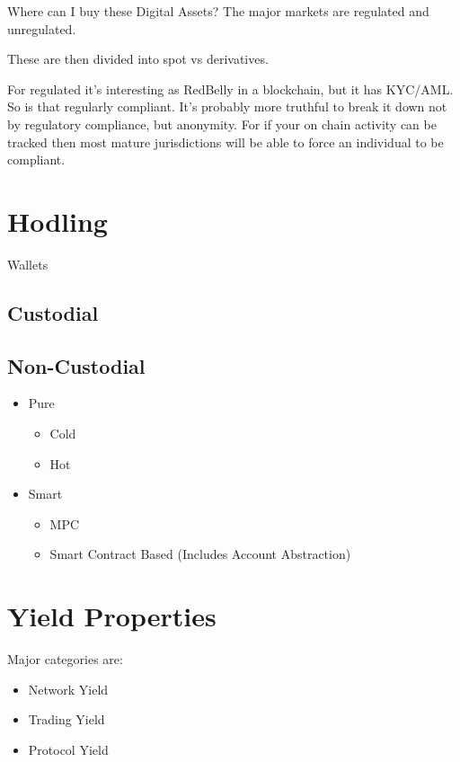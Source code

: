 \documentclass[
  letterpaper,
  DIV=11,
  numbers=noendperiod]{scrreprt}
\providecommand{\tightlist}{%
  \setlength{\itemsep}{0pt}\setlength{\parskip}{0pt}}\usepackage{longtable,booktabs,array}
\begin{document}
Where can I buy these Digital Assets? The major markets are regulated
and unregulated.

These are then divided into spot vs derivatives.

For regulated it's interesting as RedBelly in a blockchain, but it has
KYC/AML. So is that regularly compliant. It's probably more truthful to
break it down not by regulatory compliance, but anonymity. For if your
on chain activity can be tracked then most mature jurisdictions will be
able to force an individual to be compliant.

\section{Hodling}\label{hodling}

Wallets

\subsection{Custodial}\label{custodial}

\subsection{Non-Custodial}\label{non-custodial}

\begin{itemize}
\tightlist
\item
  Pure

  \begin{itemize}
  \tightlist
  \item
    Cold
  \item
    Hot
  \end{itemize}
\item
  Smart

  \begin{itemize}
  \tightlist
  \item
    MPC
  \item
    Smart Contract Based (Includes Account Abstraction)
  \end{itemize}
\end{itemize}

\section{Yield Properties}\label{yield-properties}

Major categories are:

\begin{itemize}
\tightlist
\item
  Network Yield
\item
  Trading Yield
\item
  Protocol Yield
\end{itemize}
\end{document}
